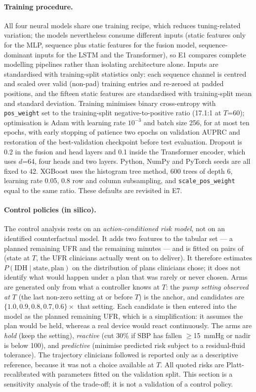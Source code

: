 \documentclass{article}
\begin{document}
\paragraph{Training procedure.} All four neural models share one training recipe, which reduces tuning-related variation; the models nevertheless consume
different inputs (static features only for the MLP, sequence plus static features for the fusion model, sequence-dominant
inputs for the LSTM and the Transformer), so E1 compares complete modelling pipelines rather than isolating architecture
alone. Inputs are standardised with training-split statistics only: each sequence channel is centred and scaled over valid (non-pad) training entries and re-zeroed at padded positions, and the fifteen static features are standardised with training-split mean and standard deviation. Training minimises binary cross-entropy with \texttt{pos\_weight} set to the training-split negative-to-positive ratio (17.1:1 at $T$=60); optimisation is Adam with learning rate $10^{-3}$ and batch size 256, for at most ten epochs, with early stopping of patience two epochs on validation AUPRC and restoration of the best-validation checkpoint before test evaluation. Dropout is 0.2 in the fusion and head layers and 0.1 inside the Transformer encoder, which uses $d$=64, four heads and two layers. Python, NumPy and PyTorch seeds are all fixed to 42. XGBoost uses the histogram tree method, 600 trees of depth 6, learning rate 0.05, 0.8 row and column subsampling, and \texttt{scale\_pos\_weight} equal to the same ratio. These defaults are revisited in E7.

\paragraph{Control policies (in silico).}\label{sec:e5}
The control analysis rests on an \emph{action-conditioned risk model}, not on an identified counterfactual model. It adds two
features to the tabular set --- a planned remaining UFR and the remaining minutes --- and is fitted on pairs of (state at $T$,
the UFR clinicians actually went on to deliver). It therefore estimates $P(\text{IDH}\mid\text{state},\text{plan})$ on the
distribution of plans clinicians chose; it does not identify what would happen under a plan that was rarely or never chosen.
Arms are generated only from what a controller knows at $T$: the \emph{pump setting observed at $T$} (the last non-zero
setting at or before $T$) is the anchor, and candidates are $\{1.0,0.9,0.8,0.7,0.6\}\times$ that setting. Each candidate is
then entered into the model as the planned remaining UFR, which is a simplification: it assumes the plan would be held,
whereas a real device would react continuously. The arms are
\emph{hold} (keep the setting), \emph{reactive} (cut 30\% if SBP has fallen $\ge$15~mmHg or nadir is below 100), and
\emph{predictive} (minimise predicted risk subject to a residual-fluid tolerance). The trajectory clinicians followed is
reported only as a descriptive reference, because it was not a choice available at $T$. All quoted risks are Platt-recalibrated
with parameters fitted on the validation split. This section is a sensitivity analysis of the trade-off; it is not a
validation of a control policy.
\end{document}

